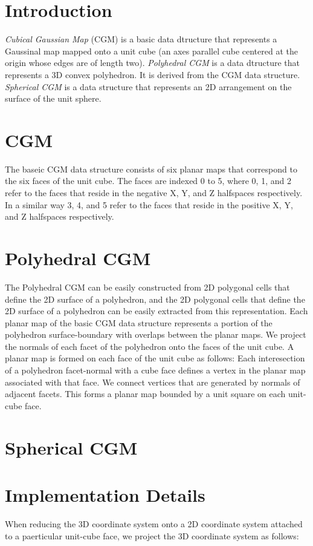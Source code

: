 \section{Introduction}
\label{CGM_sec:intro}

{\em Cubical Gaussian Map} (CGM) is a basic data dtructure that represents a
Gaussinal map mapped onto a unit cube (an axes parallel cube centered at the
origin whose edges are of length two). {\em Polyhedral CGM} is a data dtructure
that represents a 3D convex polyhedron. It is derived from the CGM data
structure. {\em Spherical CGM} is a data structure that represents an
2D arrangement on the surface of the unit sphere.

\section{CGM}
The baseic CGM data structure consists of six planar maps that
correspond to the six faces of the unit cube. The faces are indexed 0 to 5,
where 0, 1, and 2 refer to the faces that reside in the negative X, Y, and Z
halfspaces respectively. In a similar way 3, 4, and 5 refer to the faces that
reside in the positive X, Y, and Z halfspaces respectively.

\section{Polyhedral CGM}
The Polyhedral CGM can be easily constructed from 2D polygonal cells that
define the 2D surface of a polyhedron, and the 2D polygonal cells that
define the 2D surface of a polyhedron can be easily extracted from this
representation. Each planar map of the basic CGM data structure represents
a portion of the polyhedron surface-boundary with overlaps between the planar
maps. We project the normals of each facet of the polyhedron onto the faces of
the unit cube. A planar map is formed on each face of the unit cube as follows:
Each interesection of a polyhedron facet-normal with a cube face defines a
vertex in the planar map associated with that face. We connect vertices that
are generated by normals of adjacent facets. This forms a planar map bounded by
a unit square on each unit-cube face.

\section{Spherical CGM}

\section{Implementation Details}
When reducing the 3D coordinate system onto a 2D coordinate system attached
to a paerticular unit-cube face, we project the 3D coordinate system as follows:

